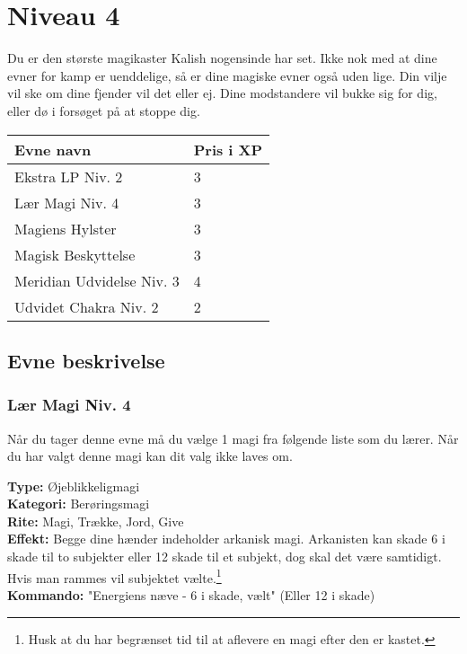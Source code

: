 \chapter{Niveau 4}
Du er den største magikaster Kalish nogensinde har set. Ikke nok med at dine evner for kamp er uenddelige, så er dine magiske evner også uden lige. Din vilje vil ske om dine fjender vil det eller ej. Dine modstandere vil bukke sig for dig, eller dø i forsøget på at stoppe dig.

\begin{table}[H]
    \centering
    \begin{tabular}{|p{}|p{}|}
    \rowcolor{cerulean!80}\hline
        Evne navn & Pris i XP \\\hline
        Ekstra LP Niv. 2 & 3 \\\hline
        Lær Magi Niv. 4 & 3 \\\hline
        Magiens Hylster  & 3 \\\hline
        Magisk Beskyttelse & 3\\\hline
        Meridian Udvidelse Niv. 3 & 4 \\\hline
        Udvidet Chakra Niv. 2 & 2 \\\hline
    \end{tabular}
\end{table}

\section{Evne beskrivelse}



\subsection{Lær Magi Niv. 4}
Når du tager denne evne må du vælge 1 magi fra følgende liste som du lærer. Når du har valgt denne magi kan dit valg ikke laves om.

\begin{lærmagi*}
\textbf{Type:} Øjeblikkeligmagi\\
\textbf{Kategori:} Berøringsmagi\\
\textbf{Rite:} Magi, Trække, Jord, Give\\
\textbf{Effekt:} Begge dine hænder indeholder arkanisk magi. Arkanisten kan skade 6 i skade til to subjekter eller 12 skade til et subjekt, dog skal det være samtidigt. Hvis man rammes vil subjektet vælte.\footnote{Husk at du har begrænset tid til at aflevere en magi efter den er kastet.}\\
\textbf{Kommando:} "Energiens næve - 6 i skade, vælt" (Eller 12 i skade)\\
\end{lærmagi*}


